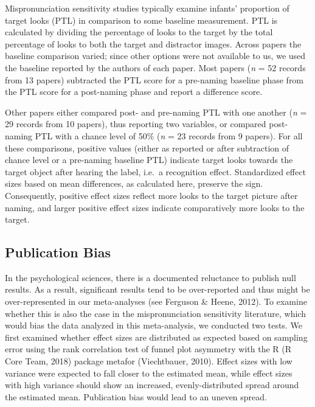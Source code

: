 \documentclass[man]{apa6}
\begin{document}
Mispronunciation sensitivity studies typically examine infants' proportion of target looks (PTL) in comparison to some baseline measurement. PTL is calculated by dividing the percentage of looks to the target by the total percentage of looks to both the target and distractor images. Across papers the baseline comparison varied; since other options were not available to us, we used the baseline reported by the authors of each paper. Most papers (\emph{n} = 52 records from 13 papers) subtracted the PTL score for a pre-naming baseline phase from the PTL score for a post-naming phase and report a difference score.

Other papers either compared post- and pre-naming PTL with one another (\emph{n} = 29 records from 10 papers), thus reporting two variables, or compared post-naming PTL with a chance level of 50\% (\emph{n} = 23 records from 9 papers). For all these comparisons, positive values (either as reported or after subtraction of chance level or a pre-naming baseline PTL) indicate target looks towards the target object after hearing the label, i.e.~a recognition effect. Standardized effect sizes based on mean differences, as calculated here, preserve the sign. Consequently, positive effect sizes reflect more looks to the target picture after naming, and larger positive effect sizes indicate comparatively more looks to the target.

\hypertarget{publication-bias}{%
\subsection{Publication Bias}\label{publication-bias}}

In the psychological sciences, there is a documented reluctance to publish null results. As a result, significant results tend to be over-reported and thus might be over-represented in our meta-analyses (see Ferguson \& Heene, 2012). To examine whether this is also the case in the mispronunciation sensitivity literature, which would bias the data analyzed in this meta-analysis, we conducted two tests. We first examined whether effect sizes are distributed as expected based on sampling error using the rank correlation test of funnel plot asymmetry with the R (R Core Team, 2018) package metafor (Viechtbauer, 2010). Effect sizes with low variance were expected to fall closer to the estimated mean, while effect sizes with high variance should show an increased, evenly-distributed spread around the estimated mean. Publication bias would lead to an uneven spread.
\end{document}
